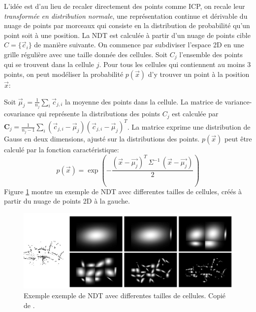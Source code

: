 \documentclass[a4paper,10pt]{scrreprt}
\begin{document}
L'idée est d'au lieu de recaler directement des points comme ICP, on recale leur \emph{transformée en distribution normale}, une représentation continue et dérivable du nuage de points par morceaux qui consiste en la distribution de probabilité qu'un point soit à une position. La NDT est calculée à partir d'un nuage de points cible $C = \{ \vec{c}_i \}$ de manière suivante. On commence par subdiviser l'espace 2D en une grille régulière avec une taille donnée des cellules. Soit $C_j$ l'ensemble des points qui se trouvent dans la cellule $j$. Pour tous les cellules qui contiennent au moins $3$ points, on peut modéliser la probabilité $p(\vec{x})$ d'y trouver un point à la position $\vec{x}$:
	
Soit $\vec{\mu}_j = \frac{1}{n_j} \sum_{i} \vec{c}_{j,i}$ la moyenne des points dans la cellule. La matrice de variance-covariance qui représente la distributions des points $C_j$ est calculée par $\mathbf{C}_j = \frac{1}{n_j - 1} \sum_i (\vec{c}_{j,i} - \vec{\mu}_j)(\vec{c}_{j,i} - \vec{\mu}_j)^T$. La matrice exprime une distribution de Gauss en deux dimensions, ajusté sur la distributions des points. $p(\vec{x})$ peut être calculé par la fonction caractéristique:
\begin{equation*}
	p(\vec{x}) = \exp \left(- \frac{ (\vec{x} - \vec{\mu_j})^T \, \Sigma^{-1} \, (\vec{x} - \vec{\mu_j}) }{2} \right)
\end{equation*}
Figure \ref{fig:ndt} montre un exemple de NDT avec differentes tailles de cellules, créés à partir du nuage de points 2D à la gauche.

\begin{figure}[p]
\center
\includegraphics[width=\textwidth]{ndt.png}
\caption[Exemple d'une Normal Distributions Transform]{Exemple exemple de NDT avec differentes tailles de cellules. Copié de \cite{Dold2007}.}
\label{fig:ndt}
\end{figure}
\end{document}
